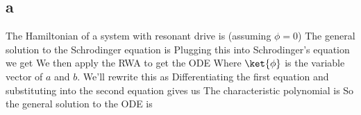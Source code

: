 \subsection*{a}
The Hamiltonian of a system with resonant drive is (assuming $\phi = 0$)
The general solution to the Schrodinger equation is
Plugging this into Schrodinger's equation we get
We then apply the RWA to get the ODE
Where $\ket{\phi}$ is the variable vector of $a$ and $b$. We'll rewrite this as
Differentiating the first equation and substituting into the second equation gives us
The characteristic polynomial is
So the general solution to the ODE is
